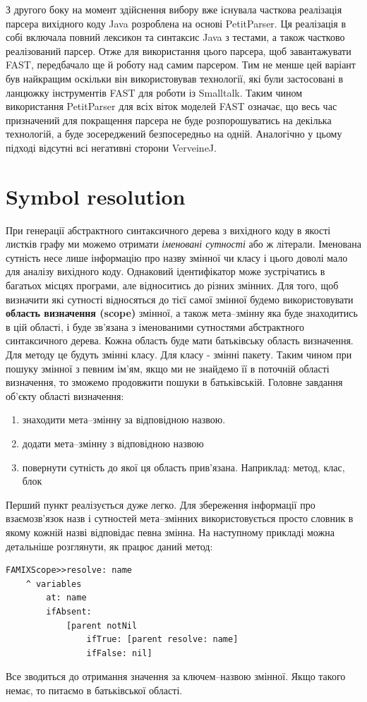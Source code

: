 \documentclass[12pt,a4paper]{article}
\begin{document}
З другого боку на момент здійснення вибору вже існувала часткова реалізація парсера вихідного коду Java розроблена на основі PetitParser. Ця реалізація в собі включала повний лексикон та синтаксис Java з тестами, а також частково реалізований парсер. Отже для використання цього парсера, щоб завантажувати FAST, передбачало ще й роботу над самим парсером. Тим не менше цей варіант був найкращим оскільки він використовував технології, які були застосовані в ланцюжку інструментів FAST для роботи із Smalltalk. Таким чином використання PetitParser для всіх віток моделей FAST означає, що весь час призначений для покращення парсера не буде розпорошуватись на декілька технологій, а буде зосереджений безпосередньо на одній. Аналогічно у цьому підході відсутні всі негативні сторони VerveineJ.

\clearpage

\section{Symbol resolution}
При генерації абстрактного синтаксичного дерева з вихідного коду в якості листків графу ми можемо отримати \emph{іменовані сутності} або ж літерали. Іменована сутність несе лише інформацію про назву змінної чи класу і цього доволі мало для аналізу вихідного коду. Однаковий ідентифікатор може зустрічатись в багатьох місцях програми, але відноситись до різних змінних. Для того, щоб визначити які сутності відносяться до тієї самої змінної будемо використовувати \textbf{область визначення (scope)} змінної, а також мета--змінну яка буде знаходитись в цій області, і буде зв'язана з іменованими сутностями абстрактного синтаксичного дерева. Кожна область буде мати батьківську область визначення. Для методу це будуть змінні класу. Для класу - змінні пакету. Таким чином при пошуку змінної з певним ім'ям, якщо ми не знайдемо її в поточній області визначення, то зможемо продовжити пошуки в батьківській. Головне завдання об'єкту області визначення:
\begin{enumerate}
\item знаходити мета--змінну за відповідною назвою.
\item додати мета--змінну з відповідною назвою
\item повернути сутність до якої ця область прив'язана. Наприклад: метод, клас, блок
\end{enumerate}

Перший пункт реалізується дуже легко. Для збереження інформації про взаємозв'язок назв і сутностей мета--змінних використовується просто словник в якому кожній назві відповідає певна змінна. На наступному прикладі можна детальніше розглянути, як працює даний метод:
\begin{lstlisting}[language=Smalltalk]
FAMIXScope>>resolve: name
	^ variables
		at: name
		ifAbsent: 
			[parent notNil 
				ifTrue: [parent resolve: name] 
				ifFalse: nil]
\end{lstlisting}
Все зводиться до отримання значення за ключем--назвою змінної. Якщо такого немає, то питаємо в батьківської області.
\end{document}
